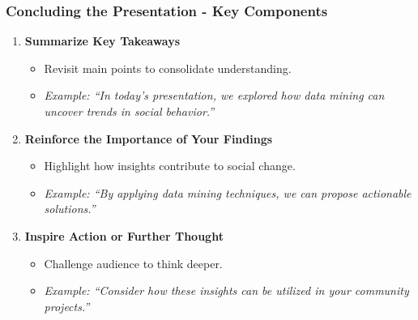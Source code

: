 \documentclass[aspectratio=169]{beamer}
\begin{document}
\begin{frame}[fragile]
    \frametitle{Concluding the Presentation - Key Components}
    \begin{enumerate}
        \item \textbf{Summarize Key Takeaways}
              \begin{itemize}
                  \item Revisit main points to consolidate understanding.
                  \item \textit{Example: “In today's presentation, we explored how data mining can uncover trends in social behavior.”}
              \end{itemize}
        \item \textbf{Reinforce the Importance of Your Findings}
              \begin{itemize}
                  \item Highlight how insights contribute to social change.
                  \item \textit{Example: “By applying data mining techniques, we can propose actionable solutions.”}
              \end{itemize}
        \item \textbf{Inspire Action or Further Thought}
              \begin{itemize}
                  \item Challenge audience to think deeper.
                  \item \textit{Example: “Consider how these insights can be utilized in your community projects.”}
              \end{itemize}
    \end{enumerate}
\end{frame}
\end{document}
